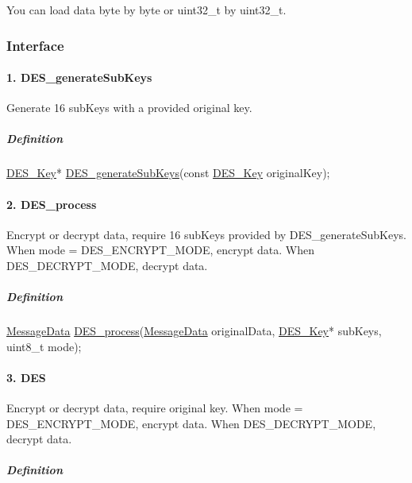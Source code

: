 You can load data byte by byte or uint32\+\_\+t by uint32\+\_\+t.

\subsubsection*{Interface}

\paragraph*{1. D\+E\+S\+\_\+generate\+Sub\+Keys}

Generate 16 sub\+Keys with a provided original key.

\subparagraph*{Definition}


\begin{DoxyCode}
\mbox{\hyperlink{a00190}{DES\_Key}}* \mbox{\hyperlink{a00023_a3ef9fea40f3c593468a2bb7862abfa0d}{DES\_generateSubKeys}}(\textcolor{keyword}{const} \mbox{\hyperlink{a00190}{DES\_Key}} originalKey);
\end{DoxyCode}


\paragraph*{2. D\+E\+S\+\_\+process}

Encrypt or decrypt data, require 16 sub\+Keys provided by D\+E\+S\+\_\+generate\+Sub\+Keys. When mode = D\+E\+S\+\_\+\+E\+N\+C\+R\+Y\+P\+T\+\_\+\+M\+O\+DE, encrypt data. When D\+E\+S\+\_\+\+D\+E\+C\+R\+Y\+P\+T\+\_\+\+M\+O\+DE, decrypt data.

\subparagraph*{Definition}


\begin{DoxyCode}
\mbox{\hyperlink{a00194}{MessageData}} \mbox{\hyperlink{a00023_a0c6c5c79645bfd3166aeb494b41a82f8}{DES\_process}}(\mbox{\hyperlink{a00194}{MessageData}} originalData, 
      \mbox{\hyperlink{a00190}{DES\_Key}}* subKeys, uint8\_t mode);
\end{DoxyCode}


\paragraph*{3. D\+ES}

Encrypt or decrypt data, require original key. When mode = D\+E\+S\+\_\+\+E\+N\+C\+R\+Y\+P\+T\+\_\+\+M\+O\+DE, encrypt data. When D\+E\+S\+\_\+\+D\+E\+C\+R\+Y\+P\+T\+\_\+\+M\+O\+DE, decrypt data.

\subparagraph*{Definition}


